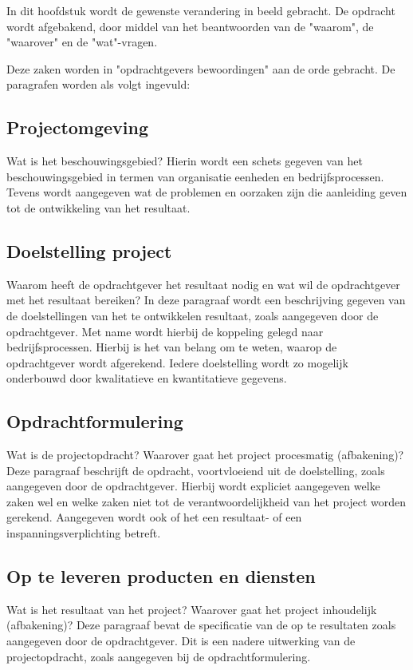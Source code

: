 \documentclass{article}
\begin{document}
In dit hoofdstuk wordt de gewenste verandering in beeld gebracht.
De opdracht wordt afgebakend, door middel van het beantwoorden van de "waarom", de "waarover" en de "wat"-vragen.

Deze zaken worden in "opdrachtgevers bewoordingen" aan de orde gebracht.
De paragrafen worden als volgt ingevuld:

\subsection{Projectomgeving}
Wat is het beschouwingsgebied?
Hierin wordt een schets gegeven van het beschouwingsgebied in termen van organisatie eenheden en bedrijfsprocessen.
Tevens wordt aangegeven wat de problemen en oorzaken zijn die aanleiding geven tot de ontwikkeling van het resultaat.


\subsection{Doelstelling project}
Waarom heeft de opdrachtgever het resultaat nodig en wat wil de opdrachtgever met het resultaat bereiken?
In deze paragraaf wordt een beschrijving gegeven van de doelstellingen van het te ontwikkelen resultaat,
zoals aangegeven door de opdrachtgever.
Met name wordt hierbij de koppeling gelegd naar bedrijfsprocessen.
Hierbij is het van belang om te weten, waarop de opdrachtgever wordt afgerekend.
Iedere doelstelling wordt zo mogelijk onderbouwd door kwalitatieve en kwantitatieve gegevens.

\subsection{Opdrachtformulering}
Wat is de projectopdracht?
Waarover gaat het project procesmatig (afbakening)?
Deze paragraaf beschrijft de opdracht, voortvloeiend uit de doelstelling, zoals aangegeven door de opdrachtgever.
Hierbij wordt expliciet aangegeven welke zaken wel en welke zaken niet tot de verantwoordelijkheid van het project worden gerekend.
Aangegeven wordt ook of het een resultaat- of een inspanningsverplichting betreft.

\subsection{Op te leveren producten en diensten}
Wat is het resultaat van het project?
Waarover gaat het project inhoudelijk (afbakening)?
Deze paragraaf bevat de specificatie van de op te resultaten zoals aangegeven door de opdrachtgever.
Dit is een nadere uitwerking van de projectopdracht, zoals aangegeven bij de opdrachtformulering.
\end{document}
